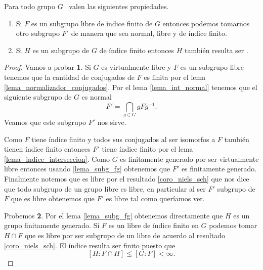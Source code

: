 \documentclass[tesis.tex]{subfiles}
\begin{document}
\begin{prop}\label{prop_vls}
	Para todo grupo $G$ \vl \ valen las siguientes propiedades.
	\begin{enumerate}
		\item Si $F$ es un subgrupo libre de índice finito de $G$ entonces podemos tomarnos otro subgrupo $F'$ de manera que sea normal, libre y de índice finito.
		\item Si $H$ es un subgrupo de $G$ de índice finito entonces $H$ también resulta ser \vl.
	\end{enumerate}
\end{prop}

\begin{proof}
	Vamos a probar \textbf{1}.
	Si $G$ es virtualmente libre y $F$ es un subgrupo libre tenemos que la cantidad de conjugados de $F$ es finita por el lema \ref{lema_normalizador_conjugados}.
	Por el lema \ref{lema_int_normal} tenemos que el siguiente subgrupo de $G$ es normal
	\[
	F' = \bigcap_{g \in G} gFg^{-1}.
	\]
	Veamos que este subgrupo $F'$ nos sirve. 
	
	
	Como $F$ tiene índice finito y todos sus conjugados al ser isomorfos a $F$ también tienen índice finito entonces $F'$ tiene índice finito por el lema \ref{lema_indice_interseccion}.
	Como $G$ es finitamente generado por ser virtualmente libre entonces usando \ref{lema_subg_fg} obtenemos que $F'$ es finitamente generado.
	Finalmente notemos que es libre por el resultado \ref{coro_niels_sch} que nos dice que todo subgrupo de un grupo libre es libre, en particular al ser $F'$ subgrupo de $F$ que es libre obtenemos que $F'$ es libre tal como queríamos ver.
	
	Probemos \textbf{2}. 
	Por el lema \ref{lema_subg_fg} obtenemos directamente que $H$ es un grupo finitamente generado.
	Si $F$ es un libre de índice finito en $G$ podemos tomar $H \cap F$ que es libre por ser subgrupo de un libre de acuerdo al resultado \ref{coro_niels_sch}.
	El índice resulta ser finito puesto que 
	\[
	[H:F\cap H] \le [G:F] < \infty.
	\]
\end{proof}
\end{document}
